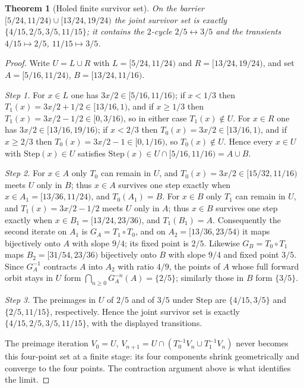 \documentclass[11pt,a4paper]{article}
\newtheorem{theorem}{Theorem}[section]
\theoremstyle{remark}
\begin{document}
\begin{theorem}[Holed finite survivor set]
\label{thm:holed}
On the barrier $[5/24,11/24) \cup [13/24,19/24)$ the joint survivor set is exactly $\{4/15,2/5,3/5,11/15\}$; it contains the $2$-cycle $2/5 \leftrightarrow 3/5$ and the transients $4/15 \mapsto 2/5$, $11/15 \mapsto 3/5$.
\end{theorem}

\begin{proof}
Write $U = L \cup R$ with $L = [5/24,11/24)$ and $R = [13/24,19/24)$, and set $A = [5/16,11/24)$, $B = [13/24,11/16)$.

\emph{Step 1.} For $x \in L$ one has $3x/2 \in [5/16,11/16)$; if $x < 1/3$ then $T_{1}(x) = 3x/2 + 1/2 \in [13/16,1)$, and if $x \ge 1/3$ then $T_{1}(x) = 3x/2 - 1/2 \in [0,3/16)$, so in either case $T_{1}(x) \notin U$. For $x \in R$ one has $3x/2 \in [13/16,19/16)$; if $x < 2/3$ then $T_{0}(x) = 3x/2 \in [13/16,1)$, and if $x \ge 2/3$ then $T_{0}(x) = 3x/2 - 1 \in [0,1/16)$, so $T_{0}(x) \notin U$. Hence every $x \in U$ with $\mathrm{Step}(x) \in U$ satisfies $\mathrm{Step}(x) \in U \cap [5/16,11/16) = A \cup B$.

\emph{Step 2.} For $x \in A$ only $T_{0}$ can remain in $U$, and $T_{0}(x) = 3x/2 \in [15/32,11/16)$ meets $U$ only in $B$; thus $x \in A$ survives one step exactly when $x \in A_{1} = [13/36,11/24)$, and $T_{0}(A_{1}) = B$. For $x \in B$ only $T_{1}$ can remain in $U$, and $T_{1}(x) = 3x/2 - 1/2$ meets $U$ only in $A$; thus $x \in B$ survives one step exactly when $x \in B_{1} = [13/24,23/36)$, and $T_{1}(B_{1}) = A$. Consequently the second iterate on $A_{1}$ is $G_{A} = T_{1} \circ T_{0}$, and on $A_{2} = [13/36,23/54)$ it maps bijectively onto $A$ with slope $9/4$; its fixed point is $2/5$. Likewise $G_{B} = T_{0} \circ T_{1}$ maps $B_{2} = [31/54,23/36)$ bijectively onto $B$ with slope $9/4$ and fixed point $3/5$. Since $G_{A}^{-1}$ contracts $A$ into $A_{2}$ with ratio $4/9$, the points of $A$ whose full forward orbit stays in $U$ form $\bigcap_{n \ge 0} G_{A}^{-n}(A) = \{2/5\}$; similarly those in $B$ form $\{3/5\}$.

\emph{Step 3.} The preimages in $U$ of $2/5$ and of $3/5$ under $\mathrm{Step}$ are $\{4/15,3/5\}$ and $\{2/5,11/15\}$, respectively. Hence the joint survivor set is exactly $\{4/15,2/5,3/5,11/15\}$, with the displayed transitions.

The preimage iteration $V_{0} = U$, $V_{n+1} = U \cap (T_{0}^{-1} V_{n} \cup T_{1}^{-1} V_{n})$ never becomes this four-point set at a finite stage: its four components shrink geometrically and converge to the four points. The contraction argument above is what identifies the limit.
\end{proof}
\end{document}
